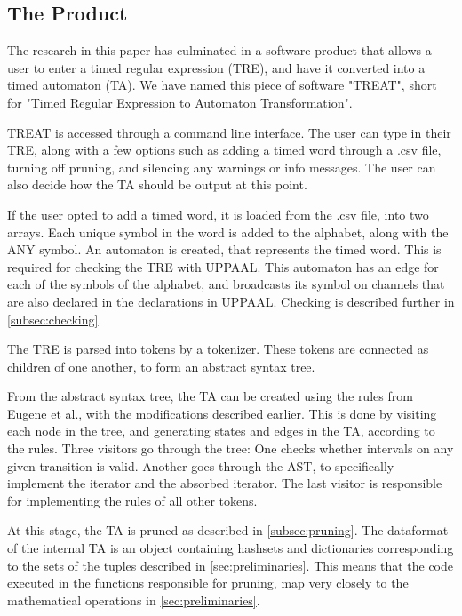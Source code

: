 \subsection{The Product}\label{subsec:theProduct}
The research in this paper has culminated in a software product that allows a user to enter a timed regular expression (TRE), and have it converted into a timed automaton (TA).
We have named this piece of software "TREAT", short for "Timed Regular Expression to Automaton Transformation".

TREAT is accessed through a command line interface. The user can type in their TRE, along with a few options such as adding a timed word through a .csv file, turning off pruning, and silencing any warnings or info messages.
The user can also decide how the TA should be output at this point.

If the user opted to add a timed word, it is loaded from the .csv file, into two arrays. Each unique symbol in the word is added to the alphabet, along with the ANY symbol.
An automaton is created, that represents the timed word. This is required for checking the TRE with UPPAAL. This automaton has an edge for each of the symbols of the alphabet, and broadcasts its symbol on channels that are also declared in the declarations in UPPAAL. Checking is described further in \cref{subsec:checking}.

The TRE is parsed into tokens by a tokenizer. These tokens are connected as children of one another, to form an abstract syntax tree. 

From the abstract syntax tree, the TA can be created using the rules from Eugene et al., with the modifications described earlier. %
This is done by visiting each node in the tree, and generating states and edges in the TA, according to the rules. Three visitors go through the tree: One checks whether intervals on any given transition is valid. Another goes through the AST, to specifically implement the iterator and the absorbed iterator. The last visitor is responsible for implementing the rules of all other tokens.

At this stage, the TA is pruned as described in \cref{subsec:pruning}. 
The dataformat of the internal TA is an object containing hashsets and dictionaries corresponding to the sets of the tuples described in \cref{sec:preliminaries}. 
This means that the code executed in the functions responsible for pruning, map very closely to the mathematical operations in \cref{sec:preliminaries}.


